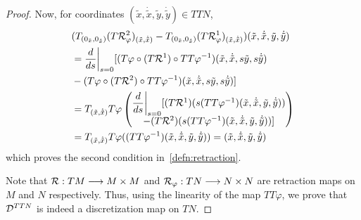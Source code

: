 \begin{prop}
\begin{proof}
        Now, for coordinates $(\tilde{x}, \dot{\tilde{x}}, \tilde{y}, \dot{\tilde{y}}) \in TTN$, 
        \begin{equation*}
            \begin{split}
                & (T_{(0_{\tilde{x}}, 0_{\dot{\tilde{x}}})}(T\mathcal{R}^2_{\varphi})_{(\tilde{x}, \dot{\tilde{x}})} - T_{(0_{\tilde{x}}, 0_{\dot{\tilde{x}}})} (T\mathcal{R}^1_{\varphi})_{(\tilde{x}, \dot{\tilde{x}})})(\tilde{x}, \dot{\tilde{x}}, \tilde{y}, \dot{\tilde{y}}) \\
                & = \dfrac{d}{ds} \bigg|_{s=0} [(T\varphi \circ (T\mathcal{R}^1) \circ TT\varphi^{-1})(\tilde{x}, \dot{\tilde{x}}, s\tilde{y}, s\dot{\tilde{y}}) \\
                & - (T\varphi \circ (T\mathcal{R}^2) \circ TT\varphi^{-1})(\tilde{x}, \dot{\tilde{x}}, s\tilde{y}, s\dot{\tilde{y}})] \\
                & = T_{(\tilde{x}, \dot{\tilde{x}})}T\varphi \begin{pmatrix} \dfrac{d}{ds} \bigg|_{s=0} [(T\mathcal{R}^1)(s (TT\varphi^{-1})(\tilde{x},\dot{\tilde{x}}, \tilde{y}, \dot{\tilde{y}})) \\
                - (T\mathcal{R}^2)(s (TT\varphi^{-1})(\tilde{x},\dot{\tilde{x}}, \tilde{y}, \dot{\tilde{y}}))]
                \end{pmatrix} \\
                & = T_{(\tilde{x}, \dot{\tilde{x}})}T\varphi((TT\varphi^{-1})(\tilde{x}, \dot{\tilde{x}}, \tilde{y}, \dot{\tilde{y}})) = (\tilde{x}, \dot{\tilde{x}}, \tilde{y}, \dot{\tilde{y}})
            \end{split}
        \end{equation*}
        which proves the second condition in~\eqref{defn:retraction}.

        Note that $\mathcal{R} : TM \longrightarrow M \times M$ and $\mathcal{R}_{\varphi} : TN \longrightarrow N \times N$ are retraction maps on $M$ and $N$ respectively.
        Thus, using the linearity of the map $TT\varphi$, we prove that $\mathcal{D}^{TTN}$ is indeed a discretization map on $TN$.
    \end{proof}
\end{prop}